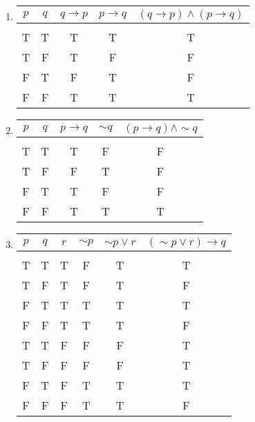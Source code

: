 \begin{enumerate}
\item 
\begin{center}
\begin{tabular}{|c | c | c | c | c|}
\hline
$p$ & $q$ & $q \to p$ & $p \to q$ & $(q \to p) \wedge (p \to q)$\\
\hline
& & & &\\
T & T & T & T & T\\
T & F & T & F & F\\
F & T & F & T & F\\
F & F & T & T & T\\
\hline
\end{tabular}
\end{center}

\item 
\begin{center}
\begin{tabular}{|c | c | c | c | c|}
\hline
$p$ & $q$ & $p \to q$ & $\sim q$ & $(p \to q) \wedge \sim q$\\
\hline
& & & &\\
T & T & T & F & F\\
T & F & F & T & F\\
F & T & T & F & F\\
F & F & T & T & T\\
\hline
\end{tabular}
\end{center}

\item 
\begin{center}
\begin{tabular}{|c | c | c | c | c | c|}
\hline
$p$ & $q$ & $r$ & $\sim p$ & $\sim p \vee r$ & $(\sim p \vee r) \to q$\\
\hline
& & & & &\\
T & T & T & F & T & T\\
T & F & T & F & T & F\\
F & T & T & T & T & T\\
F & F & T & T & T & F\\
T & T & F & F & F & T\\
T & F & F & F & F & T\\
F & T & F & T & T & T\\
F & F & F & T & T & F\\
\hline
\end{tabular}
\end{center}


\end{enumerate}
